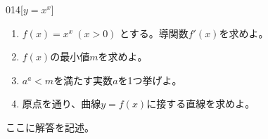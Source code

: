 \begin{prob}{014}{}{[$y=x^x$]}
 \begin{enumerate}
  \item $f(x)=x^x~(x>0)$ とする。導関数$f'(x)$を求めよ。
  \item $f(x)$の最小値$m$を求めよ。
  \item $a^a < m$を満たす実数$a$を1つ挙げよ。
  \item 原点を通り、曲線$y=f(x)$に接する直線を求めよ。
 \end{enumerate}
\end{prob}
ここに解答を記述。